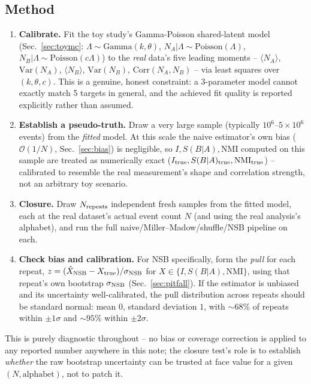 \documentclass[11pt]{article}
\newcommand{\SBA}{S(B|A)}
\newcommand{\NMI}{\mathrm{NMI}}
\begin{document}
\subsection{Method}
\label{sec:closure-method}

\begin{enumerate}
\item \textbf{Calibrate.} Fit the toy study's Gamma-Poisson shared-latent
model (Sec.~\ref{sec:toymc}: $\Lambda\sim\mathrm{Gamma}(k,\theta)$,
$N_A|\Lambda\sim\mathrm{Poisson}(\Lambda)$,
$N_B|\Lambda\sim\mathrm{Poisson}(c\Lambda)$) to the \emph{real} data's
five leading moments -- $\langle N_A\rangle$, $\mathrm{Var}(N_A)$,
$\langle N_B\rangle$, $\mathrm{Var}(N_B)$, $\mathrm{Corr}(N_A,N_B)$ --
via least squares over $(k,\theta,c)$. This is a genuine, honest
constraint: a 3-parameter model cannot exactly match 5 targets in
general, and the achieved fit quality is reported explicitly rather than
assumed.
\item \textbf{Establish a pseudo-truth.} Draw a very large sample
(typically $10^6$--$5\times10^6$ events) from the \emph{fitted} model.
At this scale the naive estimator's own bias
($\mathcal{O}(1/N)$, Sec.~\ref{sec:bias}) is negligible, so $I,\SBA,\NMI$
computed on this sample are treated as numerically exact
($I_{\rm true},\SBA_{\rm true},\NMI_{\rm true}$) -- calibrated to
resemble the real measurement's shape and correlation strength, not an
arbitrary toy scenario.
\item \textbf{Closure.} Draw $N_{\rm repeats}$ independent fresh samples
from the fitted model, each at the real dataset's actual event count $N$
(and using the real analysis's alphabet), and run the full
naive/Miller--Madow/shuffle/NSB pipeline on each.
\item \textbf{Check bias and calibration.} For NSB specifically, form the
\emph{pull} for each repeat,
$z = (\hat X_{\rm NSB}-X_{\rm true})/\sigma_{\rm NSB}$
for $X\in\{I,\SBA,\NMI\}$, using that repeat's own bootstrap
$\sigma_{\rm NSB}$ (Sec.~\ref{sec:pitfall}). If the estimator is unbiased
and its uncertainty well-calibrated, the pull distribution across repeats
should be standard normal: mean $0$, standard deviation $1$, with
$\sim\!68\%$ of repeats within $\pm1\sigma$ and $\sim\!95\%$ within
$\pm2\sigma$.
\end{enumerate}
This is purely diagnostic throughout -- no bias or coverage correction is
applied to any reported number anywhere in this note; the closure test's
role is to establish \emph{whether} the raw bootstrap uncertainty can be
trusted at face value for a given $(N,\text{alphabet})$, not to patch it.
\end{document}
